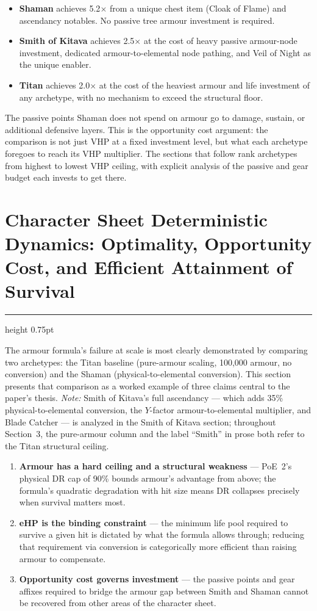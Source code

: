 \documentclass[12pt, letterpaper]{article}
\newcommand{\newsection}[1]{%
    \newpage
    \section{#1}
    \hrule height 0.75pt
    \vspace{4pt}
}
\begin{document}
\begin{itemize}
    \item \textbf{Shaman} achieves 5.2$\times$ from a unique chest item (Cloak of Flame) and ascendancy notables. No passive tree armour investment is required.
    \item \textbf{Smith of Kitava} achieves 2.5$\times$ at the cost of heavy passive armour-node investment, dedicated armour-to-elemental node pathing, and Veil of Night as the unique enabler.
    \item \textbf{Titan} achieves 2.0$\times$ at the cost of the heaviest armour and life investment of any archetype, with no mechanism to exceed the structural floor.
\end{itemize}

The passive points Shaman does not spend on armour go to damage, sustain, or additional defensive layers. This is the opportunity cost argument: the comparison is not just VHP at a fixed investment level, but what each archetype foregoes to reach its VHP multiplier. The sections that follow rank archetypes from highest to lowest VHP ceiling, with explicit analysis of the passive and gear budget each invests to get there.

\newsection{Character Sheet Deterministic Dynamics: Optimality, Opportunity Cost, and Efficient Attainment of Survival}

The armour formula's failure at scale is most clearly demonstrated by comparing two archetypes: the Titan baseline (pure-armour scaling, 100{,}000 armour, no conversion) and the Shaman (physical-to-elemental conversion). This section presents that comparison as a worked example of three claims central to the paper's thesis. \textit{Note:} Smith of Kitava's full ascendancy --- which adds 35\% physical-to-elemental conversion, the $Y$-factor armour-to-elemental multiplier, and Blade Catcher --- is analyzed in the Smith of Kitava section; throughout Section~3, the pure-armour column and the label ``Smith'' in prose both refer to the Titan structural ceiling.

\begin{enumerate}
    \item \textbf{Armour has a hard ceiling and a structural weakness} --- PoE~2's physical DR cap of 90\% bounds armour's advantage from above; the formula's quadratic degradation with hit size means DR collapses precisely when survival matters most.
    \item \textbf{eHP is the binding constraint} --- the minimum life pool required to survive a given hit is dictated by what the formula allows through; reducing that requirement via conversion is categorically more efficient than raising armour to compensate.
    \item \textbf{Opportunity cost governs investment} --- the passive points and gear affixes required to bridge the armour gap between Smith and Shaman cannot be recovered from other areas of the character sheet.
\end{enumerate}
\end{document}
